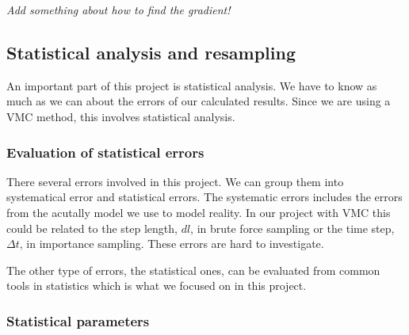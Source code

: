 \textit{Add something about how to find the gradient!}

\subsection{Statistical analysis and resampling}

An important part of this project is statistical analysis. We have to know as much as we can about the errors of our calculated results. Since we are using a VMC method, this involves statistical analysis.

\subsubsection{Evaluation of statistical errors}

There several errors involved in this project. We can group them into systematical error and statistical errors. The systematic errors includes the errors from the acutally model we use to model reality. In our project with VMC this could be related to the step length, $dl$, in brute force sampling or the time step, $\Delta t$, in importance sampling. These errors are hard to investigate.

The other type of errors, the statistical ones, can be evaluated from common tools in statistics which is what we focused on in this project.

\subsubsection{Statistical parameters}

